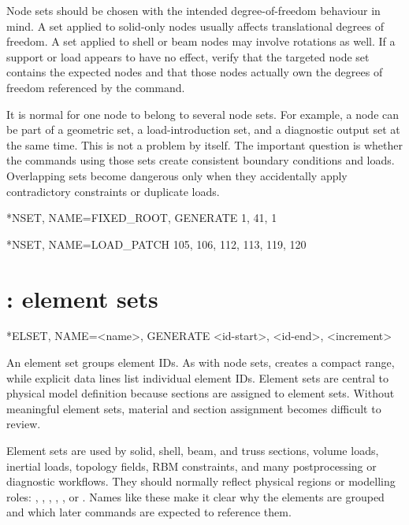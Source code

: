 Node sets should be chosen with the intended degree-of-freedom behaviour in mind. A set applied to solid-only nodes usually affects translational degrees of freedom. A set applied to shell or beam nodes may involve rotations as well. If a support or load appears to have no effect, verify that the targeted node set contains the expected nodes and that those nodes actually own the degrees of freedom referenced by the command.

It is normal for one node to belong to several node sets. For example, a node can be part of a geometric set, a load-introduction set, and a diagnostic output set at the same time. This is not a problem by itself. The important question is whether the commands using those sets create consistent boundary conditions and loads. Overlapping sets become dangerous only when they accidentally apply contradictory constraints or duplicate loads.

\begin{exampledeck}
*NSET, NAME=FIXED_ROOT, GENERATE
1, 41, 1
\end{exampledeck}

\begin{exampledeck}
*NSET, NAME=LOAD_PATCH
105, 106, 112, 113, 119, 120
\end{exampledeck}

\clearpage

\section{: element sets}

\begin{syntax}
*ELSET, NAME=<name>, GENERATE
<id-start>, <id-end>, <increment>
\end{syntax}

An element set groups element IDs. As with node sets,  creates a compact range, while explicit data lines list individual element IDs. Element sets are central to physical model definition because sections are assigned to element sets. Without meaningful element sets, material and section assignment becomes difficult to review.

Element sets are used by solid, shell, beam, and truss sections, volume loads, inertial loads, topology fields, RBM constraints, and many postprocessing or diagnostic workflows. They should normally reflect physical regions or modelling roles: , , , , , or . Names like these make it clear why the elements are grouped and which later commands are expected to reference them.


